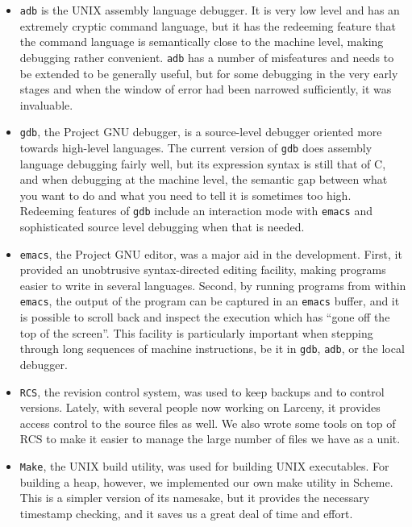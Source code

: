 \begin{itemize}
\item
{\tt adb} is the UNIX assembly language debugger. It is very low level and
has an extremely cryptic command language, but it has
 the redeeming feature that
the command language is semantically close to the machine level, making
debugging rather convenient. {\tt adb} has a number of misfeatures and needs to
be extended to be generally useful, but for some debugging in the very early
stages and when the window of error had been narrowed sufficiently, it was
invaluable.

\item
{\tt gdb}, the Project GNU debugger, is a source-level debugger oriented 
more towards high-level languages. The current version of {\tt gdb} does
assembly language debugging fairly well, but its expression syntax is still
that of C, and when debugging at the machine level, the semantic gap between
what you want to do and what you need to tell it is sometimes too high.
Redeeming features of {\tt gdb} include an interaction mode with {\tt emacs}
and sophisticated source level debugging when that is needed.

\item
{\tt emacs}, the Project GNU editor, was a major aid in the development.
First, it provided an unobtrusive syntax-directed editing facility, making
programs easier to write in several languages. Second, by running programs
from within {\tt emacs}, the output of the program can be captured in an
{\tt emacs} buffer, and it is possible to scroll back and inspect the
execution which has ``gone off the top of the screen''. This facility is
particularly important when stepping through long sequences of machine
instructions, be it in {\tt gdb}, {\tt adb}, or the local debugger.

\item
{\tt RCS}, the revision control system, was used to keep backups and to
control versions. Lately, with several people now working on Larceny, it
provides access control to the source files as well. We also wrote some
tools on top of RCS to make it easier to manage the large number of files
we have as a unit.

\item
{\tt Make}, the UNIX build utility, was used for building UNIX executables.
For building a heap, however, we implemented our own make utility in Scheme.
This is a simpler version of its namesake, but it provides the necessary
timestamp checking, and it saves us a great deal of time and effort.


\end{itemize}
